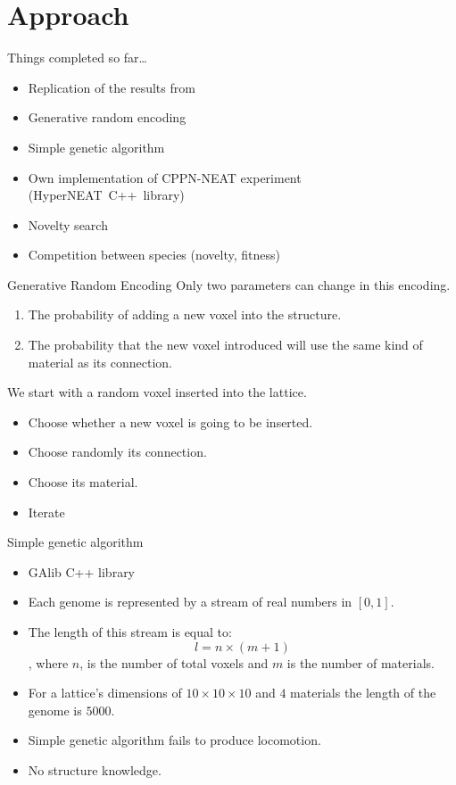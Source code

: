 \documentclass{beamer}
\begin{document}
\section{Approach}


\begin{frame}{Things completed so far\ldots}
\begin{itemize}
\item Replication of the results from~\cite{cheney2013unshackling}
\item Generative random encoding
\item Simple genetic algorithm
\item Own implementation of CPPN-NEAT experiment (HyperNEAT~C++~library)
\item Novelty search
\item Competition between species (novelty, fitness)
\end{itemize}
\end{frame}




\begin{frame}{Generative Random Encoding}
Only two parameters can change in this encoding.
\begin{enumerate}
\item The probability of adding a new voxel into the structure.
\item The probability that the new voxel introduced will use the same kind of material as its connection.
\end{enumerate}
We start with a random voxel inserted into the lattice.
\begin{itemize}
\item Choose whether a new voxel is going to be inserted.
\item Choose randomly its connection.
\item Choose its material.
\item Iterate
\end{itemize}
\end{frame}

\begin{frame}{Simple genetic algorithm}
\begin{itemize}
\item GAlib C++ library
\item Each genome is represented by a stream of real numbers in $[ 0,1 ]$.
\item The length of this stream is equal to:
\begin{equation*}
l = n \times (m + 1)
\end{equation*}
, where $n$, is the number of total voxels and $m$ is the number of materials.
\item For a lattice's dimensions of $10 \times 10 \times 10$ and $4$ materials the length of the genome is $5000$.
\item Simple genetic algorithm fails to produce locomotion.
\item No structure knowledge.
\end{itemize}
\end{frame}
\end{document}

